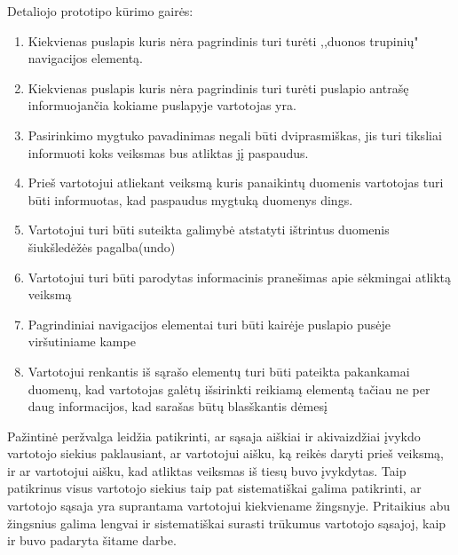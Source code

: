 \documentclass[oneside]{VUMIFPSkursinis}
\begin{document}
Detaliojo prototipo kūrimo gairės:
\begin{enumerate}
	\item{Kiekvienas puslapis kuris nėra pagrindinis turi turėti ,,duonos trupinių" navigacijos elementą.}
	\item{Kiekvienas puslapis kuris nėra pagrindinis turi turėti puslapio antrašę informuojančia kokiame puslapyje vartotojas yra.}
	\item{Pasirinkimo mygtuko pavadinimas negali būti dviprasmiškas, jis turi tiksliai informuoti koks veiksmas bus atliktas jį paspaudus.}
	\item{Prieš vartotojui atliekant veiksmą kuris panaikintų duomenis vartotojas turi būti informuotas, kad paspaudus mygtuką duomenys dings.}
	\item{Vartotojui turi būti suteikta galimybė atstatyti ištrintus duomenis šiukšledėžės pagalba(undo)}
	\item{Vartotojui turi būti parodytas informacinis pranešimas apie sėkmingai atliktą veiksmą}
	\item{Pagrindiniai navigacijos elementai turi būti kairėje puslapio pusėje viršutiniame kampe}
	\item{Vartotojui renkantis iš sąrašo elementų turi būti pateikta pakankamai duomenų, kad vartotojas galėtų išsirinkti reikiamą elementą tačiau ne per daug informacijos, kad sarašas būtų blasškantis dėmesį}
\end{enumerate}
\break
Pažintinė peržvalga leidžia patikrinti, ar sąsaja aiškiai ir akivaizdžiai įvykdo vartotojo siekius paklausiant, ar vartotojui aišku, ką reikės daryti prieš veiksmą, ir ar vartotojui aišku, kad atliktas veiksmas iš tiesų buvo įvykdytas.
Taip patikrinus visus vartotojo siekius taip pat sistematiškai galima patikrinti, ar vartotojo sąsaja yra suprantama vartotojui kiekviename žingsnyje.
\break
Pritaikius abu žingsnius galima lengvai ir sistematiškai surasti trūkumus vartotojo sąsajoj, kaip ir buvo padaryta šitame darbe.
\end{document}
